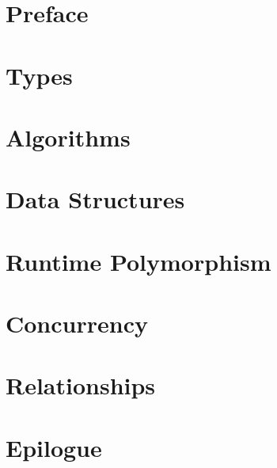 


\frontmatter
\tableofcontents

%
\chapter*{Preface}
\label{Preface}


\mainmatter


\chapter{Types}\label{better-code-types}


\chapter{Algorithms}\label{algorithms}


\chapter{Data Structures}\label{data-structures}


\chapter{Runtime Polymorphism}\label{runtime-polymorphism}


\chapter{Concurrency}\label{concurrency}


\chapter{Relationships}\label{relationships}


\chapter{Epilogue}\label{epilogue}


